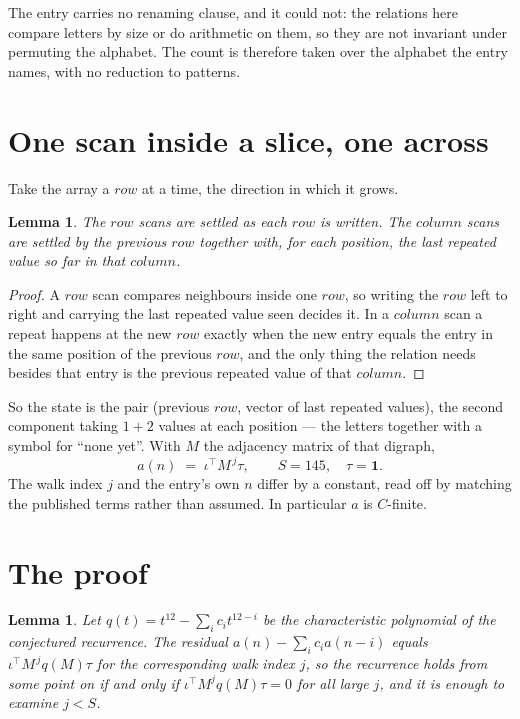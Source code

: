 \documentclass[11pt,a4paper]{article}
\theoremstyle{plain}
\newtheorem{lemma}[theorem]{Lemma}
\theoremstyle{definition}
\begin{document}
The entry carries no renaming clause, and it could not: the relations here compare letters by
size or do arithmetic on them, so they are not invariant under permuting the alphabet. The
count is therefore taken over the alphabet the entry names, with no reduction to patterns.

\section{One scan inside a slice, one across}

Take the array a $row$ at a time, the direction in which it grows.

\begin{lemma}\label{lem:state}
The $row$ scans are settled as each $row$ is written. The $column$ scans are
settled by the previous $row$ together with, for each position, the last repeated value
so far in that $column$.
\end{lemma}

\begin{proof}
A $row$ scan compares neighbours inside one $row$, so writing the
$row$ left to right and carrying the last repeated value seen decides it. In a
$column$ scan a repeat happens at the new $row$ exactly when the new entry equals the
entry in the same position of the previous $row$, and the only thing the relation needs
besides that entry is the previous repeated value of that $column$.
\end{proof}

So the state is the pair (previous $row$, vector of last repeated values), the second
component taking $1+2$ values at each position --- the letters together with a symbol for
``none yet''. With $M$ the adjacency matrix of that digraph,
\[
a(n)\;=\;\iota^{\!\top}M^{\,j}\tau ,\qquad S=145,\quad\tau=\mathbf{1} .
\]
The walk index $j$ and the entry's own $n$ differ by a constant, read off by matching the
published terms rather than assumed. In particular $a$ is $C$-finite.

\section{The proof}

\begin{lemma}\label{lem:crit}
Let $q(t)=t^{12}-\sum_i c_it^{12-i}$ be the characteristic polynomial of the
conjectured recurrence. The residual $a(n)-\sum_ic_ia(n-i)$ equals
$\iota^{\!\top}M^{\,j}q(M)\tau$ for the corresponding walk index $j$, so the recurrence
holds from some point on if and only if $\iota^{\!\top}M^{j}q(M)\tau=0$ for all large $j$,
and it is enough to examine $j<S$.
\end{lemma}
\end{document}
